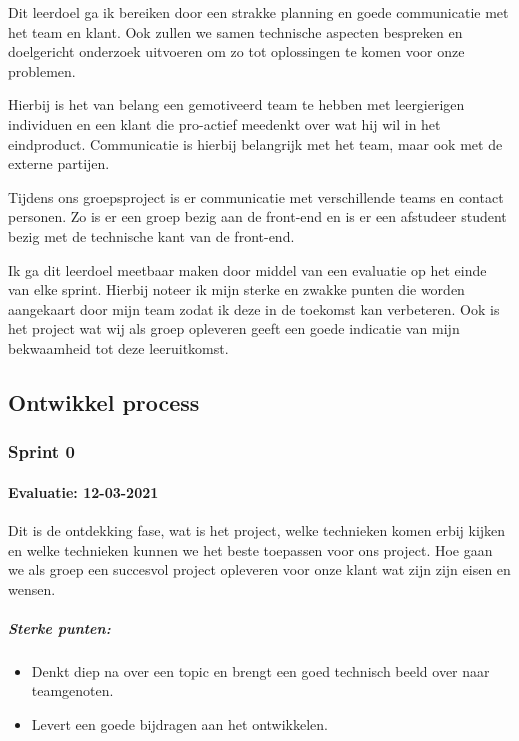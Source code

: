 Dit leerdoel ga ik bereiken door een strakke planning en goede communicatie met het team en klant.
Ook zullen we samen technische aspecten bespreken en doelgericht onderzoek uitvoeren om zo tot oplossingen te komen
voor onze problemen.


Hierbij is het van belang een gemotiveerd team te hebben met leergierigen individuen en een klant die pro-actief
meedenkt over wat hij wil in het eindproduct.
Communicatie is hierbij belangrijk met het team, maar ook met de externe partijen.

Tijdens ons groepsproject is er communicatie met verschillende teams en contact personen.
Zo is er een groep bezig aan de front-end en is er een afstudeer student bezig met de technische kant van de front-end.


Ik ga dit leerdoel meetbaar maken door middel van een evaluatie op het einde van elke sprint.
Hierbij noteer ik mijn sterke en zwakke punten die worden aangekaart door mijn team zodat ik deze in de toekomst kan verbeteren.
Ook is het project wat wij als groep opleveren geeft een goede indicatie van mijn bekwaamheid tot deze leeruitkomst.



\bigskip
\subsection{Ontwikkel process}
\subsubsection{Sprint 0}
\paragraph{Evaluatie: 12-03-2021}
Dit is de ontdekking fase, wat is het project, welke technieken komen erbij kijken
en welke technieken kunnen we het beste toepassen voor ons project.
Hoe gaan we als groep een succesvol project opleveren voor onze klant wat zijn zijn eisen en wensen.

\subparagraph{Sterke punten:}
\begin{itemize}
	\setlength{\itemsep}{0pt}%
	\setlength{\parskip}{0pt}%
	\item Denkt diep na over een topic en brengt een goed technisch beeld over naar teamgenoten.
	\item Levert een goede bijdragen aan het ontwikkelen.
\end{itemize}

